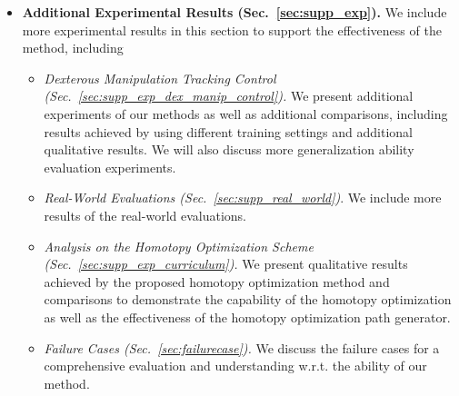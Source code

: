 \begin{itemize}
    \item  \textbf{Additional Experimental Results (Sec.~\ref{sec:supp_exp}).}  We include more experimental results in this section to support the effectiveness of the method, including 
    \begin{itemize}
        \item \textit{Dexterous Manipulation Tracking Control (Sec.~\ref{sec:supp_exp_dex_manip_control}).} We present additional experiments of our methods as well as additional comparisons, including results achieved by using different training settings and additional qualitative results. We will also discuss more generalization ability evaluation experiments. 
        \item \textit{Real-World Evaluations (Sec.~\ref{sec:supp_real_world})}.  We include more results of the real-world evaluations. 
        \item \textit{Analysis on the Homotopy Optimization Scheme (Sec.~\ref{sec:supp_exp_curriculum}).} We present qualitative results achieved by the proposed homotopy optimization method and comparisons to demonstrate the capability of the homotopy optimization as well as the effectiveness of the homotopy optimization path generator. 
        \item  \textit{Failure Cases (Sec.~\ref{sec:failurecase}). } We discuss the failure cases for a comprehensive evaluation and understanding w.r.t. the ability of our method. 
    \end{itemize}

\end{itemize}
